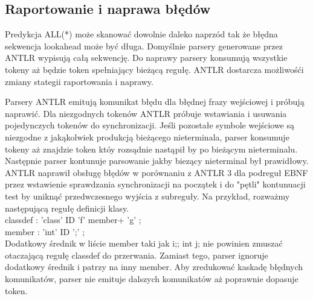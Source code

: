 ﻿\subsection{Raportowanie i naprawa błędów}
Predykcja ALL(*) może skanować dowolnie daleko naprzód tak że
błędna sekwencja lookahead może być długa. Domyślnie parsery
generowane przez ANTLR wypisują całą sekwencję. Do naprawy
parsery konsumują wszystkie tokeny aż będzie token
spełniający bieżącą regułę.
ANTLR dostarcza możliwośći zmiany stategii raportowania i naprawy.
\par
Parsery ANTLR emitują komunikat błędu dla błędnej frazy wejściowej
i próbują naprawić. Dla niezgodnych tokenów ANTLR
próbuje wstawiania i usuwania pojedynczych tokenów do synchronizacji.
Jeśli pozostałe symbole wejściowe są niezgodne z jakąkolwiek
produkcją bieżącego nieterminala, parser konsumuje tokeny aż znajdzie
token któy rozsądnie nastąpił by po bieżącym nieterminalu.
Następnie parser kontunuje parsowanie jakby biezący nieterminal
był prawidłowy. ANTLR naprawił obsługę błędów w porównaniu z ANTLR
3 dla podreguł EBNF przez wstawienie sprawdzania synchronizacji
na początek i do "pętli" kontunuacji test by uniknąć przedwczesnego
wyjścia z subreguły. Na przykład, rozważmy następującą regułę
definicji klasy.\\
classdef : 'class' ID 'f' member+ 'g' ;\\
member : 'int' ID ';' ;\\
Dodatkowy średnik w liście member taki jak i;; int
j; nie powinien zmuszać otaczającą regułę classdef do przerwania.
Zamiast tego, parser ignoruje dodatkowy średnik i patrzy na inny
member. Aby zredukować kaskadę błędnych komunikatów, parser
nie emituje dalszych komunikatów aż poprawnie dopasuje token.
